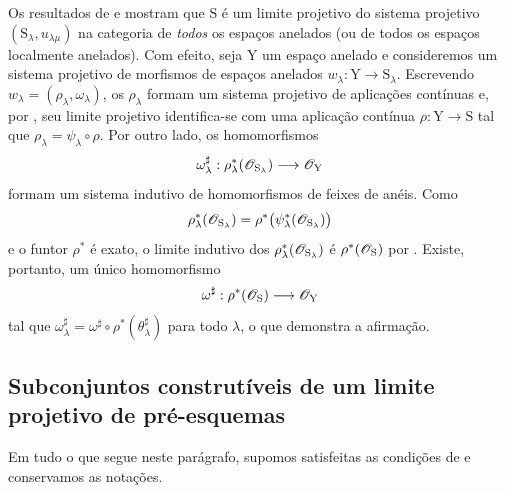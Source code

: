 \begin{remark}[8.2.14]
\label{IV.8.2.14}
Os resultados de  e  mostram que $\mathrm{S}$ é um limite projetivo do sistema projetivo $(\mathrm{S}_\lambda,u_{\lambda\mu})$ na categoria de \emph{todos} os espaços anelados (ou de todos os espaços localmente anelados).
Com efeito, seja $\mathrm{Y}$ um espaço anelado e consideremos um sistema projetivo de morfismos de espaços anelados $w_\lambda:\mathrm{Y}\to\mathrm{S}_\lambda$.
Escrevendo $w_\lambda=(\rho_\lambda,\omega_\lambda)$, os $\rho_\lambda$ formam um sistema projetivo de aplicações contínuas e, por , seu limite projetivo identifica-se com uma aplicação contínua $\rho:\mathrm{Y}\to\mathrm{S}$ tal que $\rho_\lambda=\psi_\lambda\circ\rho$. Por outro lado, os homomorfismos
\[
 \omega_\lambda^\sharp:\rho_\lambda^*(\mathscr{O}_{\mathrm{S}_\lambda})\longrightarrow\mathscr{O}_\mathrm{Y}
\]
formam um sistema indutivo de homomorfismos de feixes de anéis. Como
\[
 \rho_\lambda^*(\mathscr{O}_{\mathrm{S}_\lambda})
 =\rho^*\bigl(\psi_\lambda^*(\mathscr{O}_{\mathrm{S}_\lambda})\bigr)
\]
e o funtor $\rho^*$ é exato, o limite indutivo dos $\rho_\lambda^*(\mathscr{O}_{\mathrm{S}_\lambda})$ é $\rho^*(\mathscr{O}_\mathrm{S})$ por . Existe, portanto, um único homomorfismo
\[
 \omega^\sharp:\rho^*(\mathscr{O}_\mathrm{S})\longrightarrow\mathscr{O}_\mathrm{Y}
\]
tal que $\omega_\lambda^\sharp=\omega^\sharp\circ\rho^*(\theta_\lambda^\sharp)$ para todo $\lambda$, o que demonstra a afirmação.
\end{remark}

\subsection{Subconjuntos construtíveis de um limite projetivo de pré-esquemas}
\label{subsection:IV.8.3}

\begin{env}[8.3.1]
\label{IV.8.3.1}
Em tudo o que segue neste parágrafo, supomos satisfeitas as condições de  e conservamos as notações.
\end{env}

